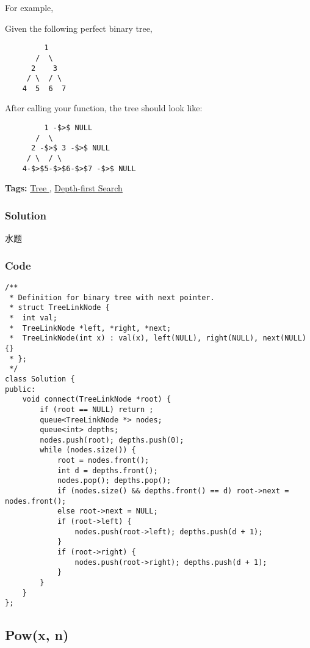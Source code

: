 \documentclass{article}
\begin{document}
\begin{CJK*}{UTF8}{gkai}
For example,


Given the following perfect binary tree,


\begin{verbatim}
         1
       /  \
      2    3
     / \  / \
    4  5  6  7
\end{verbatim}

After calling your function, the tree should look like:


\begin{verbatim}
         1 -$>$ NULL
       /  \
      2 -$>$ 3 -$>$ NULL
     / \  / \
    4-$>$5-$>$6-$>$7 -$>$ NULL
\end{verbatim}


\textbf{Tags: }
\hyperref[ Tree ]{ Tree },  \hyperref[ Depth-first Search ]{ Depth-first Search }



\subsubsection*{Solution}
水题

\subsubsection*{Code}
\begin{lstlisting}
/**
 * Definition for binary tree with next pointer.
 * struct TreeLinkNode {
 *  int val;
 *  TreeLinkNode *left, *right, *next;
 *  TreeLinkNode(int x) : val(x), left(NULL), right(NULL), next(NULL) {}
 * };
 */
class Solution {
public:
    void connect(TreeLinkNode *root) {
        if (root == NULL) return ;
        queue<TreeLinkNode *> nodes;
        queue<int> depths;
        nodes.push(root); depths.push(0);
        while (nodes.size()) {
            root = nodes.front();
            int d = depths.front();
            nodes.pop(); depths.pop();
            if (nodes.size() && depths.front() == d) root->next = nodes.front();
            else root->next = NULL;
            if (root->left) {
                nodes.push(root->left); depths.push(d + 1);
            }
            if (root->right) {
                nodes.push(root->right); depths.push(d + 1);
            }
        }
    }
}; 
\end{lstlisting}


\subsection{ Pow(x, n) }
\label{ Pow(x, n) }


\end{CJK*}
\end{document}
